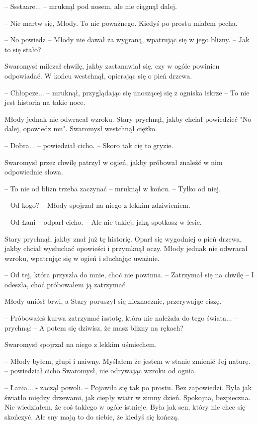 \par\noindent-- Ssstaare... -- mruknął pod nosem, ale nie ciągnął dalej.
\par\noindent-- Nie martw się, Młody. To nic poważnego. Kiedyś po prostu miałem pecha.
\par\noindent-- No powiedz -- Młody nie dawał za wygraną, wpatrując się w jego blizny. -- Jak to się stało?
\par\indent Swaromysł milczał chwilę, jakby zastanawiał się, czy w ogóle powinien odpowiadać. W końcu westchnął, opierając się o pień drzewa.
\par\noindent-- Chłopcze... -- mruknął, przyglądając się unoszącej się z ogniska iskrze -- To nie jest historia na takie noce.
\par\indent Młody jednak nie odwracał wzroku. Stary prychnął, jakby chciał powiedzieć "No dalej, opowiedz mu". Swaromysł westchnął ciężko.
\par\noindent-- Dobra... -- powiedział cicho. -- Skoro tak cię to gryzie.
\par\indent Swaromysł przez chwilę patrzył w ogień, jakby próbował znaleźć w nim odpowiednie słowa.
\par\noindent-- To nie od blizn trzeba zaczynać -- mruknął w końcu. -- Tylko od niej.
\par\noindent-- Od kogo? -- Młody spojrzał na niego z lekkim zdziwieniem.
\par\noindent-- Od Łani -- odparł cicho. -- Ale nie takiej, jaką spotkasz w lesie.
\par\indent Stary prychnął, jakby znał już tę historię. Oparł się wygodniej o pień drzewa, jakby chciał wysłuchać opowieści i przymknął oczy. Młody jednak nie odwracał wzroku, wpatrując się w ogień i słuchając uważnie.
\par\noindent-- Od tej, która przyszła do mnie, choć nie powinna. -- Zatrzymał się na chwilę -- I odeszła, choć próbowałem ją zatrzymać.
\par\indent Młody uniósł brwi, a Stary poruszył się nieznacznie, przerywając ciszę.
\par\noindent-- Próbowałeś kurwa zatrzymać isstotę, która nie należała do tego świata... -- prychnął -- A potem się dziwisz, że masz blizny na rękach?
\par\indent Swaromysł spojrzał na niego z lekkim uśmiechem.
\par\noindent-- Młody byłem, głupi i naiwny. Myślałem że jestem w stanie zmienić Jej naturę. -- powiedział cicho Swaromysł, nie odrywając wzroku od ognia. 
\par\noindent-- Łania... - zaczął powoli. -- Pojawiła się tak po prostu. Bez zapowiedzi. Była jak światło między drzewami, jak ciepły wiatr w zimny dzień. Spokojna, bezpieczna. Nie wiedziałem, że coś takiego w ogóle istnieje. Była jak sen, który nie chce się skończyć. Ale sny mają to do siebie, że kiedyś się kończą. 
